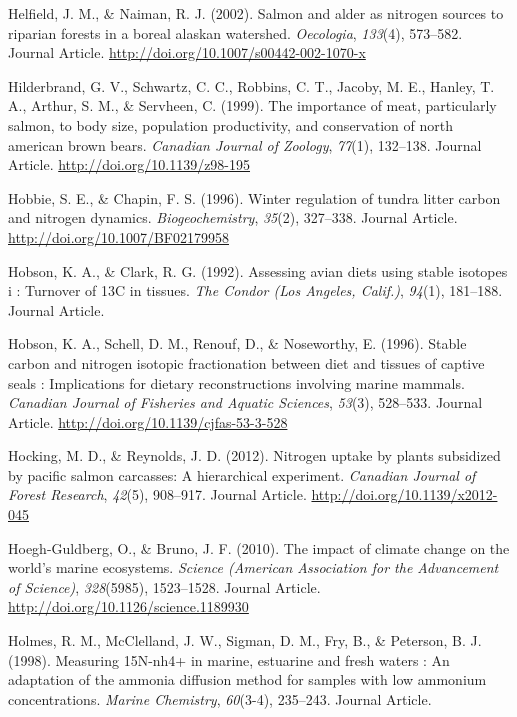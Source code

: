 \documentclass [11pt, proquest] {uwthesis}[2015/03/03]
\begin{document}
\hypertarget{ref-Helfield2002}{}
Helfield, J. M., \& Naiman, R. J. (2002). Salmon and alder as nitrogen
sources to riparian forests in a boreal alaskan watershed.
\emph{Oecologia}, \emph{133}(4), 573--582. Journal Article.
\url{http://doi.org/10.1007/s00442-002-1070-x}

\hypertarget{ref-Hilderbrand1999}{}
Hilderbrand, G. V., Schwartz, C. C., Robbins, C. T., Jacoby, M. E.,
Hanley, T. A., Arthur, S. M., \& Servheen, C. (1999). The importance of
meat, particularly salmon, to body size, population productivity, and
conservation of north american brown bears. \emph{Canadian Journal of
Zoology}, \emph{77}(1), 132--138. Journal Article.
\url{http://doi.org/10.1139/z98-195}

\hypertarget{ref-Hobbie1996}{}
Hobbie, S. E., \& Chapin, F. S. (1996). Winter regulation of tundra
litter carbon and nitrogen dynamics. \emph{Biogeochemistry},
\emph{35}(2), 327--338. Journal Article.
\url{http://doi.org/10.1007/BF02179958}

\hypertarget{ref-Hobson1992}{}
Hobson, K. A., \& Clark, R. G. (1992). Assessing avian diets using
stable isotopes i : Turnover of 13C in tissues. \emph{The Condor (Los
Angeles, Calif.)}, \emph{94}(1), 181--188. Journal Article.

\hypertarget{ref-Hobson1996}{}
Hobson, K. A., Schell, D. M., Renouf, D., \& Noseworthy, E. (1996).
Stable carbon and nitrogen isotopic fractionation between diet and
tissues of captive seals : Implications for dietary reconstructions
involving marine mammals. \emph{Canadian Journal of Fisheries and
Aquatic Sciences}, \emph{53}(3), 528--533. Journal Article.
\url{http://doi.org/10.1139/cjfas-53-3-528}

\hypertarget{ref-Hocking2012}{}
Hocking, M. D., \& Reynolds, J. D. (2012). Nitrogen uptake by plants
subsidized by pacific salmon carcasses: A hierarchical experiment.
\emph{Canadian Journal of Forest Research}, \emph{42}(5), 908--917.
Journal Article. \url{http://doi.org/10.1139/x2012-045}

\hypertarget{ref-Hoegh2010}{}
Hoegh-Guldberg, O., \& Bruno, J. F. (2010). The impact of climate change
on the world's marine ecosystems. \emph{Science (American Association
for the Advancement of Science)}, \emph{328}(5985), 1523--1528. Journal
Article. \url{http://doi.org/10.1126/science.1189930}

\hypertarget{ref-Holmes1998}{}
Holmes, R. M., McClelland, J. W., Sigman, D. M., Fry, B., \& Peterson,
B. J. (1998). Measuring 15N-nh4+ in marine, estuarine and fresh waters :
An adaptation of the ammonia diffusion method for samples with low
ammonium concentrations. \emph{Marine Chemistry}, \emph{60}(3-4),
235--243. Journal Article.
\end{document}
